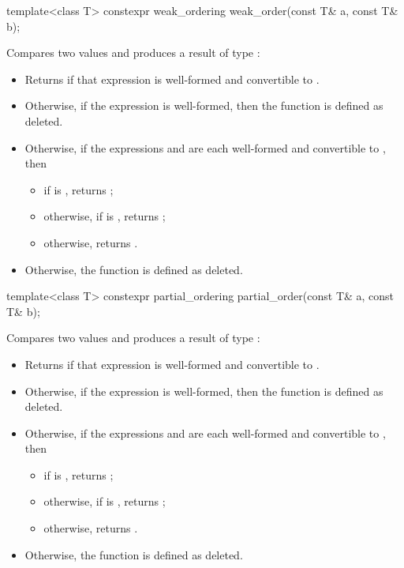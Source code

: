 %
\begin{itemdecl}
template<class T> constexpr weak_ordering weak_order(const T& a, const T& b);
\end{itemdecl}

\begin{itemdescr}
\pnum
\effects
Compares two values and produces a result of type :

\begin{itemize}
\item
Returns  if that expression is well-formed and
convertible to .
\item
Otherwise, if the expression  is well-formed,
then the function is defined as deleted.
\item
Otherwise, if the expressions  and 
are each well-formed and convertible to , then
\begin{itemize}
\item
if  is ,
returns ;
\item
otherwise, if  is ,
returns ;
\item
otherwise, returns .
\end{itemize}
\item
Otherwise, the function is defined as deleted.
\end{itemize}
\end{itemdescr}

%
\begin{itemdecl}
template<class T> constexpr partial_ordering partial_order(const T& a, const T& b);
\end{itemdecl}

\begin{itemdescr}
\pnum
\effects
Compares two values and produces a result of type :

\begin{itemize}
\item
Returns  if that expression is well-formed and
convertible to .
\item
Otherwise, if the expression  is well-formed,
then the function is defined as deleted.
\item
Otherwise, if the expressions  and 
are each well-formed and convertible to , then
\begin{itemize}
\item
if  is ,
returns ;
\item
otherwise, if  is ,
returns ;
\item
otherwise, returns .
\end{itemize}
\item
Otherwise, the function is defined as deleted.
\end{itemize}
\end{itemdescr}

